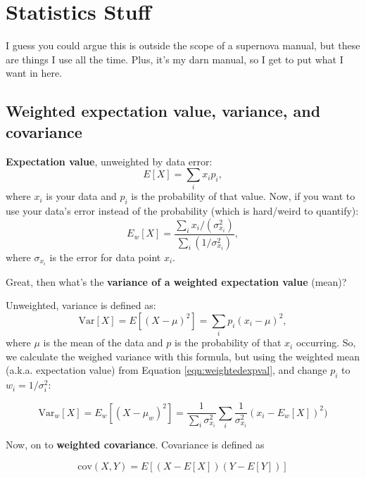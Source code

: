 \newcommand{\cov}{\mathrm{cov}}

\section{Statistics Stuff}
I guess you could argue this is outside the scope of a supernova manual, but these are things I use all the time. Plus, it's my darn manual, so I get to put what I want in here.

\subsection{Weighted expectation value, variance, and covariance}
\textbf{Expectation value}, unweighted by data error:
\begin{equation}
\label{eqn:expval}
    E[X] = \sum_{i} x_{i}p_{i},
\end{equation}
where $x_{i}$ is your data and $p_{i}$ is the probability of that value. Now, if you want to use your data's error instead of the probability (which is hard/weird to quantify):
\begin{equation}
\label{eqn:weightedexpval}
    E_{w}[X] = \frac{\sum_{i}x_{i}/(\sigma_{x_{i}}^{2})}{\sum_{i} (1/\sigma_{x_{i}}^{2})},
\end{equation}
where $\sigma_{x_{i}}$ is the error for data point $x_{i}$.

Great, then what's the \textbf{variance of a weighted expectation value} (mean)? 

Unweighted, variance is defined as:
\begin{equation}
    \mathrm{Var}[X] = E[(X-\mu)^{2}] = \sum_{i} p_{i}(x_{i}-\mu)^{2},
\end{equation}
where $\mu$ is the mean of the data and $p$ is the probability of that $x_{i}$ occurring. So, we calculate the weighed variance with this formula, but using the weighted mean (a.k.a. expectation value) from Equation \ref{eqn:weightedexpval}, and change $p_{i}$ to $w_{i} = 1/\sigma_{i}^{2}$:

\begin{equation}
\label{eqn:weightedvariance}
    \mathrm{Var}_{w}[X] = E_{w}[(X - \mu_{w})^{2}] = \frac{1}{\sum_{i} \sigma_{x_{i}}^{2}} \sum_{i}\frac{1}{\sigma_{x_{i}}^{2}} (x_{i} - E_{w}[X])^{2})
\end{equation}

Now, on to \textbf{weighted covariance}. Covariance is defined as 

\begin{equation}
    \mathrm{cov}(X,Y) = E[(X-E[X])(Y-E[Y])]
\end{equation}


